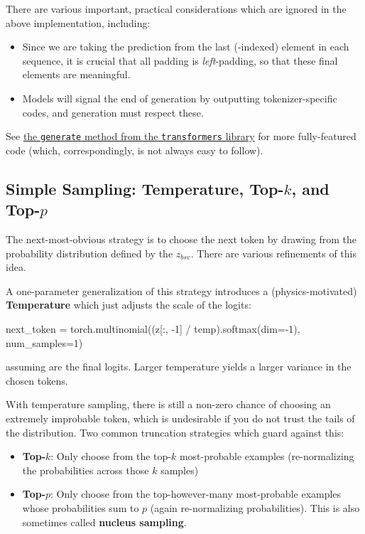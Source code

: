 \documentclass[11pt]{article}
\begin{document}
There are various important, practical considerations which are ignored in the above implementation, including:
\begin{itemize}
    \item Since we are taking the prediction from the last (-indexed) element in each
    sequence, it is crucial that all padding is \textit{left}-padding, so that these final
    elements are meaningful.
    \item Models will signal the end of generation by outputting tokenizer-specific codes, and
    generation must respect these.
\end{itemize}
See
\href{https://github.com/huggingface/transformers/blob/04ab5605fbb4ef207b10bf2772d88c53fc242e83/src/transformers/generation/utils.py#L1115}{the
\texttt{generate} method from the \texttt{transformers} library} for more fully-featured code
(which, correspondingly, is not always easy to follow).

\subsection{Simple Sampling: Temperature, Top-$ k $, and Top-$ p $ \label{subsec_simple_sampling}}

The next-most-obvious strategy is to choose the next token by drawing from the probability
distribution defined by the $ z _{ bsv } $. There are various refinements of this idea.

A one-parameter generalization of this strategy
introduces a (physics-motivated) \textbf{Temperature} which just adjusts the scale of the logits:
\begin{py}
next_token = torch.multinomial((z[:, -1] / temp).softmax(dim=-1), num_samples=1)
\end{py}
assuming  are the final logits. Larger temperature yields a larger variance in the chosen
tokens.

With temperature sampling, there is still a non-zero chance of choosing an extremely improbable token,
which is undesirable if you do not trust the tails of the distribution. Two common truncation
strategies which guard against this:
\begin{itemize}
    \item \textbf{Top-}$ k $: Only choose from the top-$ k $ most-probable examples (re-normalizing
        the probabilities across those $ k $ samples)
    \item \textbf{Top-}$  p$: Only choose from the top-however-many most-probable examples whose
    probabilities sum to $ p $ (again re-normalizing probabilities). This is also sometimes called
    \textbf{nucleus sampling}.
\end{itemize}
\end{document}
